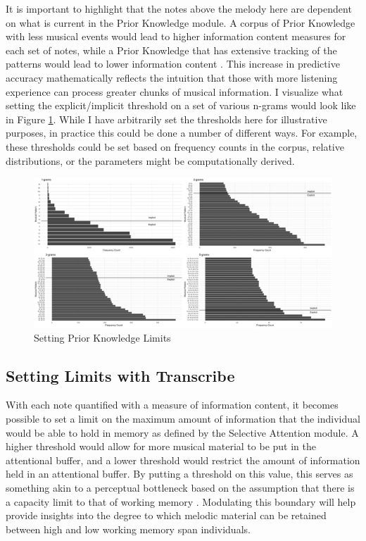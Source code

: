\documentclass[12pt,]{book}
\begin{document}
It is important to highlight that the notes above the melody here are dependent on what is current in the Prior Knowledge module.
A corpus of Prior Knowledge with less musical events would lead to higher information content measures for each set of notes, while a Prior Knowledge that has extensive tracking of the patterns would lead to lower information content \citep{conklinMultipleViewpointSystems1995}.
This increase in predictive accuracy mathematically reflects the intuition that those with more listening experience can process greater chunks of musical information.
I visualize what setting the explicit/implicit threshold on a set of various n-grams would look like in Figure \ref{fig:thresholds}.
While I have arbitrarily set the thresholds here for illustrative purposes, in practice this could be done a number of different ways.
For example, these thresholds could be set based on frequency counts in the corpus, relative distributions, or the parameters might be computationally derived.

\begin{figure}

{\centering \includegraphics[width=1\linewidth]{img/pk_grampanel} 

}

\caption{Setting Prior Knowledge Limits}\label{fig:thresholds}
\end{figure}

\hypertarget{setting-limits-with-transcribe}{%
\subsection{Setting Limits with Transcribe}\label{setting-limits-with-transcribe}}

With each note quantified with a measure of information content, it becomes possible to set a limit on the maximum amount of information that the individual would be able to hold in memory as defined by the Selective Attention module.
A higher threshold would allow for more musical material to be put in the attentional buffer, and a lower threshold would restrict the amount of information held in an attentional buffer.
By putting a threshold on this value, this serves as something akin to a perceptual bottleneck based on the assumption that there is a capacity limit to that of working memory \citep{cowanEvolvingConceptionsMemory1988, cowanMagicalMysteryFour2010}.
Modulating this boundary will help provide insights into the degree to which melodic material can be retained between high and low working memory span individuals.
\end{document}
